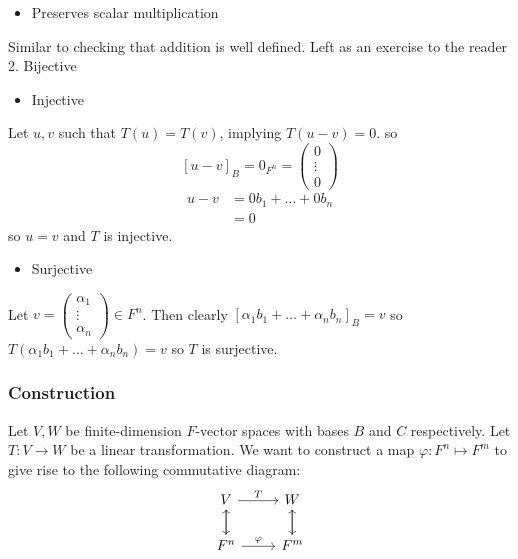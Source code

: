 \documentclass{report}
\theoremstyle{remark}
\theoremstyle{definition}
\theoremstyle{definition}
\theoremstyle{theorem}
\begin{document}
\begin{itemize}
    \item Preserves scalar multiplication
\end{itemize}
Similar to checking that addition is well defined. Left as an exercise to the reader \\
2. Bijective
\begin{itemize}
    \item Injective
\end{itemize}
Let $u,v$ such that $T(u) = T(v)$, implying $T(u-v) = 0$. so $$[u-v]_B = 0_{F^n} = \begin{pmatrix}0\\ \vdots \\ 0\end{pmatrix}$$ \begin{align*} u-v &= 0b_1 + \ldots + 0b_n \\ &=0\end{align*} so $u = v$ and $T$ is injective.

\begin{itemize}
    \item Surjective
\end{itemize}
Let $v = \begin{pmatrix}\alpha_1\\ \vdots \\ \alpha_n\end{pmatrix}\in F^n$. Then clearly $[\alpha_1b_1+\ldots + \alpha_nb_n]_B = v$ so $T(\alpha_1b_1+\ldots + \alpha_nb_n) = v$ so $T$ is surjective.
\setcounter{subsubsection}{4.3.3}
\subsubsection{Construction}
Let $V,W$ be finite-dimension $F$-vector spaces with bases $B$ and $C$ respectively. Let $T:V\rightarrow W$  be a linear transformation. We want to construct a map $\varphi:F^n\mapsto F^m$ to give rise to the following commutative diagram:
$$\begin{tikzcd}
    V\arrow[r, "T"]\arrow[d] &W\arrow[d]\\
    F^n\arrow[r,"\varphi"]\arrow[u] &F^m\arrow[u]
\end{tikzcd}$$
\end{document}
